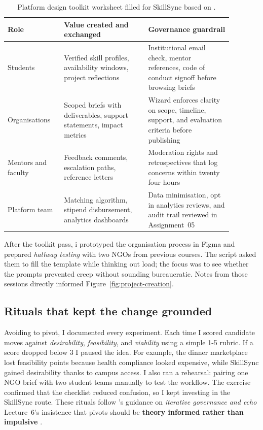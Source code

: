 \begin{table}[H]
  \centering
  \caption{Platform design toolkit worksheet filled for SkillSync based on \citet{Reillier2017}.}
  \label{tab:platform-map}
  \begin{tabular}{p{0.22\linewidth}p{0.33\linewidth}p{0.33\linewidth}}
    \toprule
    Role & Value created and exchanged & Governance guardrail \\
    \midrule
    Students & Verified skill profiles, availability windows, project reflections & Institutional email check, mentor references, code of conduct signoff before browsing briefs \\
    Organisations & Scoped briefs with deliverables, support statements, impact metrics & Wizard enforces clarity on scope, timeline, support, and evaluation criteria before publishing \\
    Mentors and faculty & Feedback comments, escalation paths, reference letters & Moderation rights and retrospectives that log concerns within twenty four hours \\
    Platform team & Matching algorithm, stipend disbursement, analytics dashboards & Data minimisation, opt in analytics reviews, and audit trail reviewed in Assignment~05 \\
    \bottomrule
  \end{tabular}
\end{table}

After the toolkit pass, i prototyped the organisation process in Figma and prepared \textit{hallway testing} with two NGOs from previous courses. The script asked them to fill the template while thinking out load; the focus was to see whether the prompts prevented creep without sounding bureaucratic. Notes from those sessions directly informed Figure~\ref{fig:project-creation}.

\subsection*{Rituals that kept the change grounded}
Avoiding to pivot, I documented every experiment. Each time I scored candidate moves against \textit{desirability}, \textit{feasibility}, and \textit{viability} using a simple 1-5 rubric. If a score dropped below 3 I paused the idea. For example, the dinner marketplace lost feasibility points because health compliance looked expensive, while SkillSync gained desirability thanks to campus access. I also ran a rehearsal: pairing one NGO brief with two student teams manually to test the workflow. The exercise confirmed that the checklist reduced confusion, so I kept investing in the SkillSync route. These rituals follow \citet{Choudary2016}'s guidance on \textit{iterative governance and echo} Lecture~6's insistence that pivots should be \textbf{theory informed rather than impulsive} \citep{Lecture06}.

